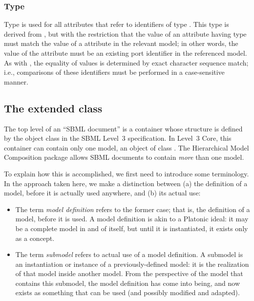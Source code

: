 \subsubsection{Type \fixttspace{}}
\label{primtype-portidref}

Type  is used for all attributes that refer to
identifiers of type .  This type is derived from
, but with the restriction that the value of an
attribute having type  must match the value of a
 attribute in the relevant model;  in other words, the value of
the attribute must be an existing port identifier in
the referenced model.  As with , the equality of
 values is determined by exact character sequence
match; i.e., comparisons of these identifiers must be performed in a
case-sensitive manner.


\subsection{The extended  class}
\label{sbml-class}
\label{listofmodeldefinitions-class}
\label{listofexternalmodeldefinitions-class}

The top level of an ``SBML document'' is a container whose structure is
defined by the object class \SBML in the SBML Level~3 specification.  In
Level~3 Core, this container can contain only one model, an object of
class \Model.  The Hierarchical Model Composition package allows SBML
documents to contain \emph{more} than one model.

To explain how this is accomplished, we first need to introduce some
terminology.  In the approach taken here, we make a distinction between
(a) the definition of a model, before it is actually used anywhere, and
(b) its actual use:

\begin{itemize}

\item The term \emph{model definition} refers to the former case; that
  is, the definition of a model, before it is used.  A model definition
  is akin to a Platonic ideal: it may be a complete model in and of
  itself, but until it is instantiated, it exists only as a concept.

\item The term \emph{submodel} refers to actual use of a model
  definition.  A submodel is an instantiation or instance of a
  previously-defined model: it is the realization of that model inside
  another model.  From the perspective of the model that contains this
  submodel, the model definition has come into being, and now exists as
  something that can be used (and possibly modified and adapted).

\end{itemize}


